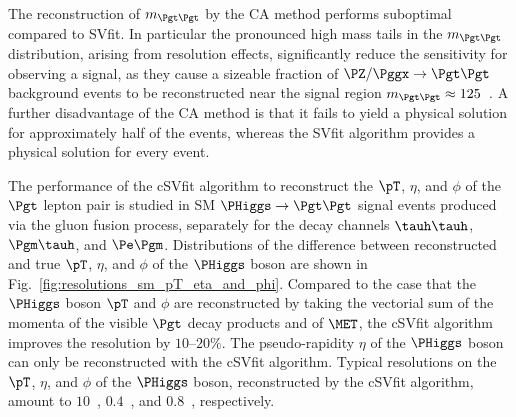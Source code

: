 The reconstruction of $m_{\Pgt\Pgt}$ by the CA method performs suboptimal compared to SVfit.
In particular the pronounced high mass tails in the $m_{\Pgt\Pgt}$ distribution, arising from resolution effects,
significantly reduce the sensitivity for observing a signal,
as they cause a sizeable fraction of $\PZ/\Pggx \to \Pgt\Pgt$ background events
to be reconstructed near the signal region $m_{\Pgt\Pgt} \approx 125$~\GeV.
A further disadvantage of the CA method is that it fails to yield a physical solution for approximately half of the events,
whereas the SVfit algorithm provides a physical solution for every event. 

The performance of the cSVfit algorithm to reconstruct the $\pT$,
$\eta$, and $\phi$ of the $\Pgt$ lepton pair is studied in SM $\PHiggs
\to \Pgt\Pgt$ signal events produced via the gluon fusion process,
separately for the decay channels $\tauh\tauh$, $\Pgm\tauh$, and $\Pe\Pgm$.
Distributions of the difference between reconstructed and true $\pT$,
$\eta$, and $\phi$ of the $\PHiggs$ boson are shown in
Fig.~\ref{fig:resolutions_sm_pT_eta_and_phi}.
Compared to the case that the $\PHiggs$ boson $\pT$ and $\phi$ are
reconstructed by taking the vectorial sum of the momenta of the visible $\Pgt$
decay products and of $\MET$, the cSVfit algorithm improves the
resolution by $10$--$20\%$. The pseudo-rapidity $\eta$ of the
$\PHiggs$ boson can only be reconstructed with the cSVfit algorithm.
Typical resolutions on the $\pT$, $\eta$, and $\phi$ of the $\PHiggs$ boson,
reconstructed by the cSVfit algorithm, amount to $10$~\GeV, $0.4$~\rad, and $0.8$~\rad,
respectively.

%
%

